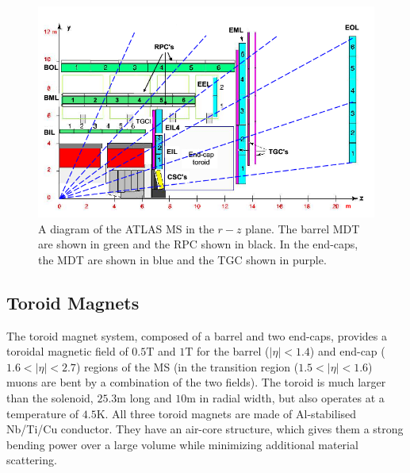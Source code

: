 \begin{figure}[htbp]
\centering
\includegraphics[width=.8\textwidth]{figures/Detector/atlas-ms.png}
\caption{A diagram of the \ac{ATLAS} \ac{MS} in the $r-z$ plane. The barrel \ac{MDT} are shown in green and the \ac{RPC} shown in black. In the end-caps, the \ac{MDT} are shown in blue and the \ac{TGC} shown in purple. \cite{ms-vertices}}
\label{fig:atlas-ms}
\end{figure}




\subsection{Toroid Magnets}

The toroid magnet system, composed of a barrel and two end-caps, provides a toroidal magnetic field of $0.5 \textrm{T}$ and $1 \textrm{T}$ for the barrel ($|\eta| < 1.4$) and end-cap ($1.6 <|\eta| < 2.7$) regions of the \ac{MS} (in the transition region ($1.5 < |\eta| < 1.6$) muons are bent by a combination of the two fields). The toroid is much larger than the solenoid, $25.3 \textrm{m}$ long and $10 \textrm{m}$ in radial width, but also operates at a temperature of $4.5 \textrm{K}$. All three toroid magnets are made of Al-stabilised Nb/Ti/Cu conductor. They have an air-core structure, which gives them a strong bending power over a large volume while minimizing additional material scattering. 




